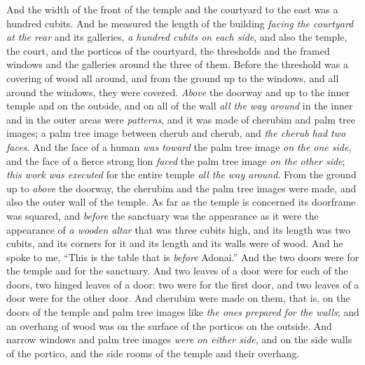 \begin{biblechapter}
\verse And the width of the front of the temple and the courtyard to the east was a hundred cubits.
\verse And he measured the length of the building \textit{facing the courtyard} \textit{at the rear} and its galleries, \textit{a hundred cubits on each side}, and also the temple, the court, and the porticos of the courtyard,
\verse the thresholds and the framed windows and the galleries around the three of them. Before the threshold was a covering of wood all around, and from the ground up to the windows, and all around the windows, they were covered.
\verse \textit{Above} the doorway and up to the inner temple and on the outside, and on all of the wall \textit{all the way around} in the inner and in the outer areas were \textit{patterns},
\verse and it was made of cherubim and palm tree images; a palm tree image between cherub and cherub, and \textit{the cherub had two faces}.
\verse And the face of a human \textit{was toward} the palm tree image \textit{on the one side}, and the face of a fierce strong lion \textit{faced} the palm tree image \textit{on the other side}; \textit{this work was executed} for the entire temple \textit{all the way around}.
\verse From the ground up to \textit{above} the doorway, the cherubim and the palm tree images were made, and also the outer wall of the temple.
\verse As far as the temple is concerned its doorframe was squared, and \textit{before} the sanctuary was the appearance as it were the appearance of
\verse \textit{a wooden altar} that was three cubits high, and its length was two cubits, and its corners for it and its length and its walls were of wood. And he spoke to me, “This is the table that is \textit{before} Adonai.”
\verse And the two doors were for the temple and for the sanctuary.
\verse And two leaves of a door were for each of the doors, two hinged leaves of a door: two were for the first door, and two leaves of a door were for the other door.
\verse And cherubim were made on them, that is, on the doors of the temple and palm tree images like \textit{the ones prepared for the walls}; and an overhang of wood was on the surface of the porticos on the outside.
\verse And narrow windows and palm tree images \textit{were on either side}, and on the side walls of the portico, and the side rooms of the temple and their overhang.
\end{biblechapter}

